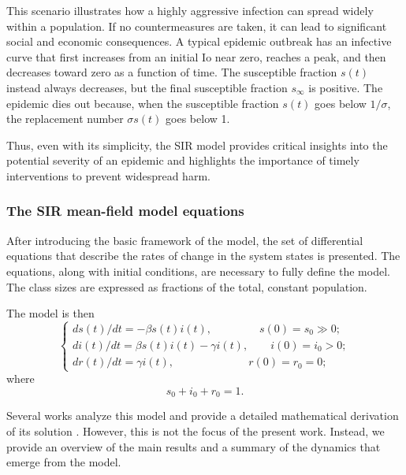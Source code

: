 \begin{itemize}
	This scenario illustrates how a highly aggressive infection can spread widely within a population. If no countermeasures are taken, it can lead to significant social and economic consequences. A typical epidemic outbreak has an infective curve that first increases from an initial Io near zero, reaches a peak, and then
	decreases toward zero as a function of time. The susceptible fraction $s(t)$ instead always
	decreases, but the final susceptible fraction $s_\infty$ is positive. The epidemic dies out because, when the susceptible fraction $s(t)$ goes below $1/\sigma$, the replacement number $\sigma s(t)$ goes below 1.
		
\end{itemize}
	Thus, even with its simplicity, the SIR model provides critical insights into the potential severity of an epidemic and highlights the importance of timely interventions to prevent widespread harm.
	

\subsubsection{The SIR mean-field model equations}
After introducing the basic framework of the model, the set of differential equations that describe the rates of change in the system states is presented. The equations, along with initial conditions, are necessary to fully define the model. The class sizes are expressed as fractions of the total, constant population.

The model is then
\begin{equation}
	\begin{cases}
		ds(t) / dt = -\beta s(t) i(t), \;\qquad \qquad s(0) = s_0 \gg 0;\\
		di(t) / dt =  \beta s(t) i(t) - \gamma i(t), \qquad i(0) = i_0 > 0;\\
		dr(t) / dt =  \gamma i(t), \qquad \; \, \;\quad \quad \qquad r(0) = r_0 = 0;
	\end{cases}
\end{equation}
where
\begin{equation}
s_0 + i_0 + r_0 = 1.
\end{equation}

Several works analyze this model and provide a detailed mathematical derivation of its solution \cite{diekmann2000mathematical,akinboro2014numerical,Turkyilmazoglu_2021}. However, this is not the focus of the present work. Instead, we provide an overview of the main results and a summary of the dynamics that emerge from the model.

